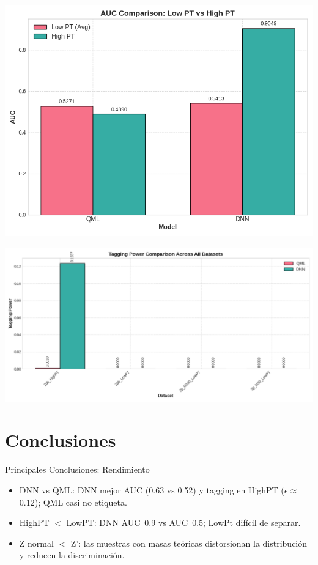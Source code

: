 \documentclass{beamer}
\begin{document}
\begin{frame}
  \includegraphics[width=1\textwidth]{resumen_hmmm/auc_low_vs_high_pt.png}
\end{frame}

\begin{frame}
  \includegraphics[width=1\textwidth]{resumen_hmmm/tagging_power_all_datasets.png}
\end{frame}

\section{Conclusiones}

\begin{frame}{Principales Conclusiones: Rendimiento}
  \begin{itemize}
    \item DNN vs QML: DNN mejor AUC (0.63 vs 0.52) y tagging en HighPT ($\epsilon \approx$0.12); QML casi no etiqueta.
    \item HighPT $<$ LowPT: DNN AUC~0.9 vs AUC~0.5; LowPt difícil de separar.
    \item Z normal $<$ Z': las muestras con masas teóricas distorsionan la distribución y reducen la discriminación.
  \end{itemize}
\end{frame}
\end{document}

